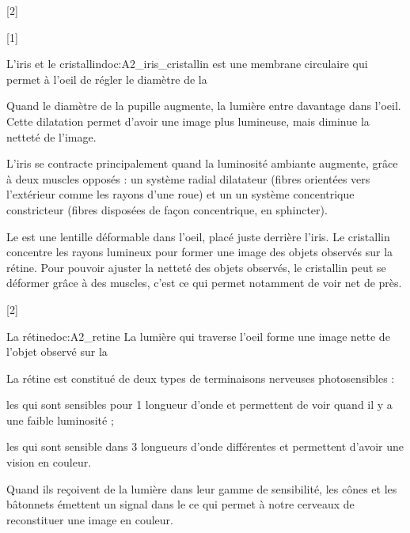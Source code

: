 [2]

[1]


\begin{doc}{L'iris et le cristallin}{doc:A2_iris_cristallin}
   est une membrane circulaire qui permet à l'oeil de régler le diamètre de la  
  
  Quand le diamètre de la pupille augmente, la lumière entre davantage dans l'oeil.
  Cette dilatation permet d'avoir une image plus lumineuse, mais diminue la netteté de l'image.

  L'iris se contracte principalement quand la luminosité ambiante augmente, grâce à deux muscles opposés : un système radial dilatateur (fibres orientées vers l'extérieur comme les rayons d'une roue) et un un système concentrique constricteur (fibres disposées de façon concentrique, en sphincter).

  Le  est une lentille déformable dans l'oeil, placé juste derrière l'iris.
  Le cristallin concentre les rayons lumineux pour former une image des objets observés sur la rétine.
  Pour pouvoir ajuster la netteté des objets observés, le cristallin peut se déformer grâce à des muscles, c'est ce qui permet notamment de voir net de près.
\end{doc}

[2]


\begin{doc}{La rétine}{doc:A2_retine}
  La lumière qui traverse l'oeil forme une image nette de l'objet observé sur la 

  
  La rétine est constitué de deux types de terminaisons nerveuses photosensibles :
  \begin{listePoints}
    \item les  qui sont sensibles pour 1 longueur d'onde et permettent de voir quand il y a une faible luminosité ;
    \item les  qui sont sensible dans 3 longueurs d'onde différentes et permettent d'avoir une vision en couleur.
  \end{listePoints}
  Quand ils reçoivent de la lumière dans leur gamme de sensibilité, les cônes et les bâtonnets émettent un signal dans le  ce qui permet à notre cerveaux de reconstituer une image en couleur.
\end{doc}

